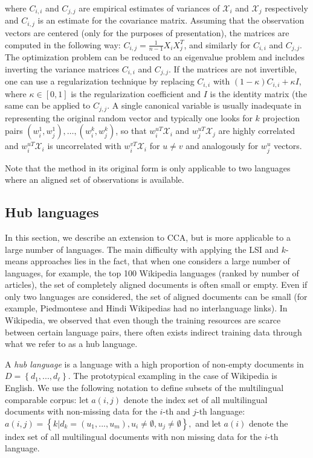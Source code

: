 \documentclass[twoside,11pt]{article}
\begin{document}
where $C_{i,i}$ and $C_{j,j}$ are empirical estimates of variances of $\mathcal{X}_i$ and $\mathcal{X}_j$ respectively and $C_{i,j}$ is an estimate for the covariance matrix. Assuming that the observation vectors are centered (only for the purposes of presentation), the matrices are computed in the following way: $C_{i,j} = \frac{1}{n-1}X_i X_j^T$, and similarly for $C_{i,i}$ and $C_{j,j}$.
The optimization problem can be reduced to an eigenvalue problem and includes inverting the variance matrices $C_{i,i}$ and $C_{j,j}$. If the matrices are not invertible, one can use a regularization technique by replacing $C_{i,i}$ with $(1- \kappa)C_{i,i} + \kappa I$, where $\kappa \in [0,1]$ is the regularization coefficient and $I$ is the identity matrix (the same can be applied to $C_{j,j}$.
A single canonical variable is usually inadequate in representing the original random vector and typically one looks for $k$ projection pairs $(w_i^1, w_j^1),\ldots,(w_i^k, w_j^k)$, so that $w_i^{uT} \mathcal{X}_i$ and $w_j^{uT} \mathcal{X}_j$ are highly correlated and $w_i^{uT} \mathcal{X}_i$ is uncorrelated with $w_i^{vT} \mathcal{X}_i$  for $u \neq v$ and analogously for $w_j^u$ vectors.

Note that the method in its original form is only applicable to two languages where an aligned set of observations is available.

\subsection{Hub languages}

In this section, we describe an extension to CCA, but is more applicable to a large number of languages. The main difficulty with applying the
LSI and $k$-means approaches lies in the fact, that when one considers a large number of languages, for example, the top 100 Wikipedia languages (ranked by number of articles), the set of completely
aligned documents is often small or empty. Even if only two languages are considered, the set of aligned documents can be small (for example, Piedmontese and Hindi
Wikipedias had no interlanguage links). In Wikipedia, we observed that even though the training resources are scarce between certain language pairs, there often exists indirect training data
through what we refer to as a hub language.

A \emph{hub language} is a language with a high proportion of non-empty documents in $D = \left\{d_1,..., d_{\ell}\right\}$. The prototypical  exampling  in the case of Wikipedia is English. We use the following notation to define subsets of the multilingual comparable corpus: let $a(i,j)$ denote the index set of all multilingual documents with non-missing data for the $i$-th and $j$-th language:  $a(i,j) = \left\{k | d_k = (u_1,...,u_m), u_i \neq \emptyset, u_j \neq \emptyset \right\},$ and let $a(i)$ denote the index set of all multilingual documents with non missing data for the $i$-th language.
\end{document}
